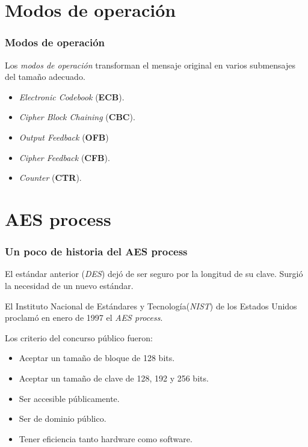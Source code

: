 \documentclass{beamer}
\begin{document}
\section{Modos de operación}
	\begin{frame}
	\frametitle{Modos de operación}
		Los \textit{modos de operación} transforman el mensaje original en varios submensajes del tamaño adecuado.
		
		\begin{itemize}
			\item \textit{Electronic Codebook} (\textbf{ECB}).
			
			\item \textit{Cipher Block Chaining} (\textbf{CBC}).
			
			\item \textit{Output Feedback} (\textbf{OFB})
			
			\item \textit{Cipher Feedback} (\textbf{CFB}).
			
			\item \textit{Counter} (\textbf{CTR}).
		\end{itemize}
	\end{frame}
		
\section{AES process}
	\begin{frame}
	\frametitle{Un poco de historia del AES process}
	El estándar anterior (\textit{DES}) dejó de ser seguro por la longitud de su clave. Surgió la necesidad de un nuevo estándar.
	
	El Instituto Nacional de Estándares y Tecnología(\textit{NIST}) de los Estados Unidos proclamó en enero de 1997 el \textit{AES process}.
	
	Los criterio del concurso público fueron:
	\begin{itemize}
		\item Aceptar un tamaño de bloque de 128 bits.
		
		\item Aceptar un tamaño de clave de 128, 192 y 256 bits.
		
		\item Ser accesible públicamente.
		
		\item Ser de dominio público.
		
		\item Tener eficiencia tanto hardware como software.
	\end{itemize}
	\end{frame}
	
\end{document}
